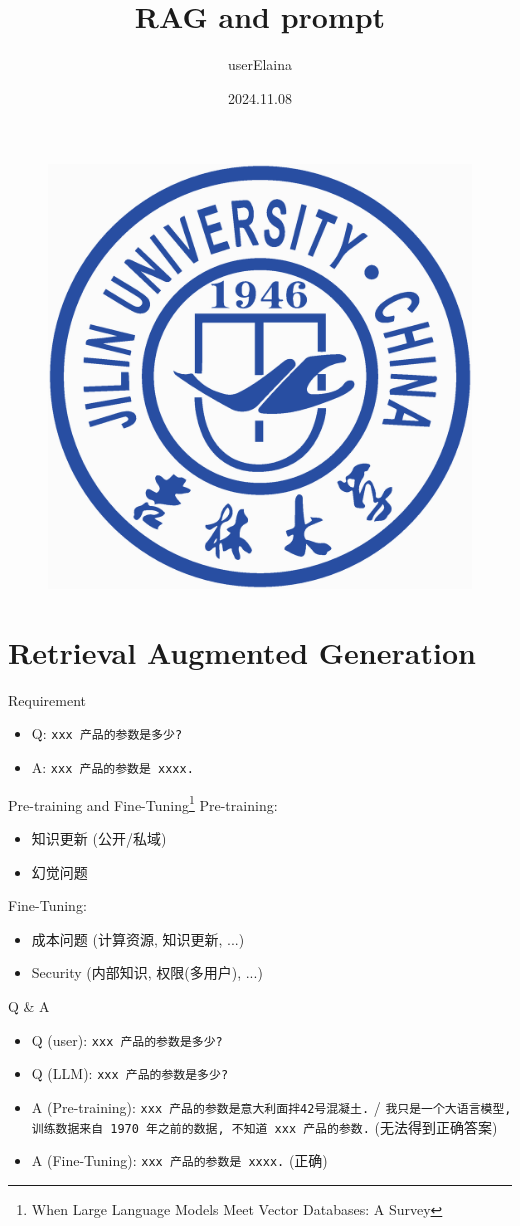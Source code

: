 \documentclass{beamer}
\author{userElaina}
\title{RAG and prompt}
\institute{School of AI}
\date{2024.11.08}
\begin{document}
\kaishu
\begin{frame}
    \titlepage
    \begin{figure}[htpb]
        \begin{center}
            \includegraphics[width=0.15\linewidth]{pic/Jilin_University_Logo.eps}
        \end{center}
    \end{figure}
\end{frame}

\begin{frame}
\tableofcontents[sectionstyle=show,subsectionstyle=show/shaded/hide,subsubsectionstyle=show/shaded/hide]
\end{frame}

\section{Retrieval Augmented Generation}

\begin{frame}{Requirement}
    \begin{itemize}
        \item Q: {\tt xxx 产品的参数是多少?}
        \item A: {\tt xxx 产品的参数是 xxxx.}
    \end{itemize}
\end{frame}

\begin{frame}{Pre-training and Fine-Tuning\footnote{When Large Language Models Meet Vector Databases: A Survey}}
    Pre-training:
    \begin{itemize}
        \item 知识更新 (公开/私域)
        \item 幻觉问题
    \end{itemize}
    Fine-Tuning:
    \begin{itemize}
        \item 成本问题 (计算资源, 知识更新, ...)
        \item Security (内部知识, 权限(多用户), ...)
    \end{itemize}
\end{frame}

\begin{frame}{Q \& A}
    \begin{itemize}
        \item Q (user): {\tt xxx 产品的参数是多少?}
        \item Q (LLM): {\tt xxx 产品的参数是多少?}
        \item A (Pre-training): {\tt xxx 产品的参数是意大利面拌42号混凝土.} / {\tt 我只是一个大语言模型, 训练数据来自 1970 年之前的数据, 不知道 xxx 产品的参数.} (无法得到正确答案)
        \item A (Fine-Tuning): {\tt xxx 产品的参数是 xxxx.} (正确)
    \end{itemize}
\end{frame}
\end{document}
